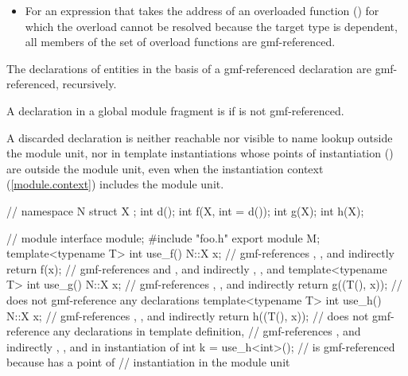 \begin{std.txt}
\begin{itemize}
\begin{ncsimplebnf}
postfix-expression \terminal{(} expression-list\opt{} \terminal{)}
\end{ncsimplebnf}
whose  denotes a dependent name,
or for an operator expression whose operator denotes a dependent name,
consider an expression synthesized from it
by replacing each type-dependent argument or operand
with a value of a placeholder type
with no associated namespaces or entities.
All declarations found by name lookup
for the corresponding name
in the synthesized expression are gmf-referenced.
\item
For an expression that takes the address of an overloaded function ()
for which the overload cannot be resolved because the target type is dependent,
all members of the set of overload functions are gmf-referenced.
\end{itemize}
The declarations of entities in the basis of a gmf-referenced declaration are gmf-referenced, recursively.

\pnum
A declaration  in a global module fragment is  if 
is not gmf-referenced.
\begin{note}
A discarded declaration is neither reachable
nor visible to name lookup outside the module unit,
nor in template instantiations whose points of instantiation
() are outside the module unit,
even when the instantiation context (\ref{module.context})
includes the module unit.
\end{note}

\pnum
\begin{example}
\begin{codeblock}
// 
namespace N {
  struct X {};
  int d();
  int f(X, int = d());
  int g(X);
  int h(X);
}

// module  interface
module;
#include "foo.h"
export module M;
template<typename T> int use_f() {
  N::X x;                    // gmf-references , , and indirectly \tcode{::}
  return f(x);               // gmf-references  and , and indirectly , , and \tcode{::}
}
template<typename T> int use_g() {
  N::X x;                    // gmf-references , , and indirectly \tcode{::}
  return g((T(), x));        // does not gmf-reference any declarations
}
template<typename T> int use_h() {
  N::X x;                    // gmf-references , , and indirectly \tcode{::}
  return h((T(), x));        // does not gmf-reference any declarations in template definition, 
                             // gmf-references , and indirectly , , and \tcode{::} in instantiation of 
}
int k = use_h<int>();
  //  is gmf-referenced because  has a point of
  // instantiation in the module unit 


\end{codeblock}
\end{example}
\end{std.txt}
